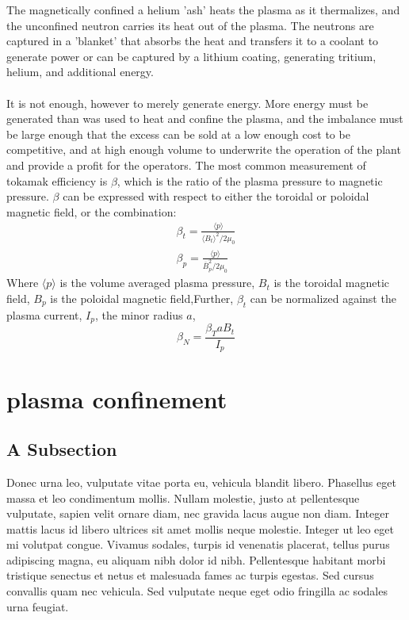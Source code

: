 The magnetically confined a helium 'ash' heats the plasma as it thermalizes, and the unconfined neutron carries its heat out of the plasma.  The neutrons are captured in a 'blanket' that absorbs the heat and transfers it to a coolant to generate power or can be captured by a lithium coating, generating tritium, helium, and additional energy.
\paragraph{}
It is not enough, however to merely generate energy.  More energy must be generated than was used to heat and confine the plasma, and the imbalance must be large enough that the excess can be sold at a low enough cost to be competitive, and at high enough volume to underwrite the operation of the plant and provide a profit for the operators.  The most common measurement of tokamak efficiency is $\beta$, which is the ratio of the plasma pressure to magnetic pressure.  $\beta$ can be expressed with respect to either the toroidal or poloidal magnetic field, or the combination:
\begin{eqnarray}	
\beta_t = \frac{\langle p \rangle}{\langle B_t \rangle^2/2\mu_0}\\
\beta_p = \frac{\langle p \rangle}{\overline{B}_p^2/2\mu_0}
\end{eqnarray}
Where $\langle p \rangle$ is the volume averaged plasma pressure, $B_t$ is the toroidal magnetic field, $B_p$ is the poloidal magnetic field,Further, $\beta_t$ can be normalized against the plasma current, $I_p$, the minor radius $a$, \begin{equation}
\beta_N = \frac{\beta_T a B_t}{I_p}
\end{equation}
\section{plasma confinement}

\subsection{A Subsection}

Donec urna leo, vulputate vitae porta eu, vehicula blandit libero. Phasellus eget massa et leo condimentum mollis. Nullam molestie, justo at pellentesque vulputate, sapien velit ornare diam, nec gravida lacus augue non diam. Integer mattis lacus id libero ultrices sit amet mollis neque molestie. Integer ut leo eget mi volutpat congue. Vivamus sodales, turpis id venenatis placerat, tellus purus adipiscing magna, eu aliquam nibh dolor id nibh. Pellentesque habitant morbi tristique senectus et netus et malesuada fames ac turpis egestas. Sed cursus convallis quam nec vehicula. Sed vulputate neque eget odio fringilla ac sodales urna feugiat.

